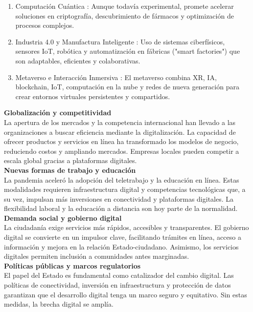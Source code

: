 \documentclass[12pt]{article}
\begin{document}
\begin{enumerate}
    \item Computación Cuántica : Aunque todavía experimental, promete acelerar soluciones en criptografía, descubrimiento de fármacos y optimización de procesos complejos.
    \item Industria 4.0 y Manufactura Inteligente : Uso de sistemas ciberfísicos, sensores IoT, robótica y automatización en fábricas ("smart factories") que son adaptables, eficientes y colaborativas.
    \item Metaverso e Interacción Inmersiva : El metaverso combina XR, IA, blockchain, IoT, computación en la nube y redes de nueva generación para crear entornos virtuales persistentes y compartidos.
\end{enumerate}

\textbf{Globalización y competitividad}\\
La apertura de los mercados y la competencia internacional han llevado a las organizaciones a 
buscar eficiencia mediante la digitalización. La capacidad de ofrecer productos y servicios en 
línea ha transformado los modelos de negocio, reduciendo costos y ampliando mercados. 
Empresas locales pueden competir a escala global gracias a plataformas digitales.\\

\textbf{Nuevas formas de trabajo y educación}\\
La pandemia aceleró la adopción del teletrabajo y la educación en línea. Estas modalidades 
requieren infraestructura digital y competencias tecnológicas que, a su vez, impulsan más 
inversiones en conectividad y plataformas digitales. La flexibilidad laboral y la educación a 
distancia son hoy parte de la normalidad.\\

\textbf{Demanda social y gobierno digital}\\
La ciudadanía exige servicios más rápidos, accesibles y transparentes. El gobierno digital 
se convierte en un impulsor clave, facilitando trámites en línea, acceso a información y 
mejora en la relación Estado-ciudadano. Asimismo, los servicios digitales permiten inclusión 
a comunidades antes marginadas.\\

\textbf{Políticas públicas y marcos regulatorios}\\
El papel del Estado es fundamental como catalizador del cambio digital. Las políticas de 
conectividad, inversión en infraestructura y protección de datos garantizan que el desarrollo 
digital tenga un marco seguro y equitativo. Sin estas medidas, la brecha digital se amplía.\\
\end{document}
